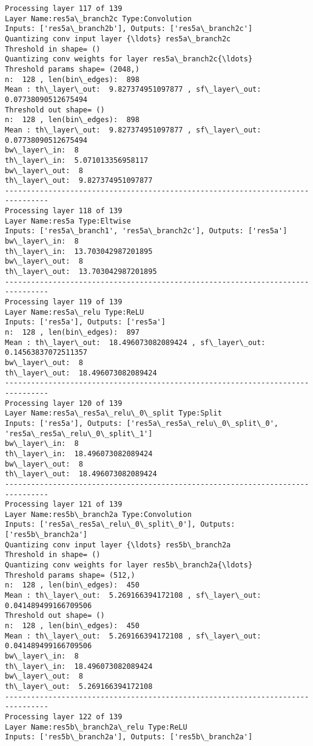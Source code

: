 \documentclass[11pt]{article}
\begin{document}
\begin{Verbatim}[commandchars=\\\{\}]
Processing layer 117 of 139
Layer Name:res5a\_branch2c Type:Convolution
Inputs: ['res5a\_branch2b'], Outputs: ['res5a\_branch2c']
Quantizing conv input layer {\ldots} res5a\_branch2c
Threshold in shape= ()
Quantizing conv weights for layer res5a\_branch2c{\ldots}
Threshold params shape= (2048,)
n:  128 , len(bin\_edges):  898
Mean : th\_layer\_out:  9.827374951097877 , sf\_layer\_out:  0.07738090512675494
Threshold out shape= ()
n:  128 , len(bin\_edges):  898
Mean : th\_layer\_out:  9.827374951097877 , sf\_layer\_out:  0.07738090512675494
bw\_layer\_in:  8
th\_layer\_in:  5.071013356958117
bw\_layer\_out:  8
th\_layer\_out:  9.827374951097877
--------------------------------------------------------------------------------
Processing layer 118 of 139
Layer Name:res5a Type:Eltwise
Inputs: ['res5a\_branch1', 'res5a\_branch2c'], Outputs: ['res5a']
bw\_layer\_in:  8
th\_layer\_in:  13.703042987201895
bw\_layer\_out:  8
th\_layer\_out:  13.703042987201895
--------------------------------------------------------------------------------
Processing layer 119 of 139
Layer Name:res5a\_relu Type:ReLU
Inputs: ['res5a'], Outputs: ['res5a']
n:  128 , len(bin\_edges):  897
Mean : th\_layer\_out:  18.496073082089424 , sf\_layer\_out:  0.14563837072511357
bw\_layer\_out:  8
th\_layer\_out:  18.496073082089424
--------------------------------------------------------------------------------
Processing layer 120 of 139
Layer Name:res5a\_res5a\_relu\_0\_split Type:Split
Inputs: ['res5a'], Outputs: ['res5a\_res5a\_relu\_0\_split\_0', 'res5a\_res5a\_relu\_0\_split\_1']
bw\_layer\_in:  8
th\_layer\_in:  18.496073082089424
bw\_layer\_out:  8
th\_layer\_out:  18.496073082089424
--------------------------------------------------------------------------------
Processing layer 121 of 139
Layer Name:res5b\_branch2a Type:Convolution
Inputs: ['res5a\_res5a\_relu\_0\_split\_0'], Outputs: ['res5b\_branch2a']
Quantizing conv input layer {\ldots} res5b\_branch2a
Threshold in shape= ()
Quantizing conv weights for layer res5b\_branch2a{\ldots}
Threshold params shape= (512,)
n:  128 , len(bin\_edges):  450
Mean : th\_layer\_out:  5.269166394172108 , sf\_layer\_out:  0.041489499166709506
Threshold out shape= ()
n:  128 , len(bin\_edges):  450
Mean : th\_layer\_out:  5.269166394172108 , sf\_layer\_out:  0.041489499166709506
bw\_layer\_in:  8
th\_layer\_in:  18.496073082089424
bw\_layer\_out:  8
th\_layer\_out:  5.269166394172108
--------------------------------------------------------------------------------
Processing layer 122 of 139
Layer Name:res5b\_branch2a\_relu Type:ReLU
Inputs: ['res5b\_branch2a'], Outputs: ['res5b\_branch2a']

\end{Verbatim}
\end{document}
